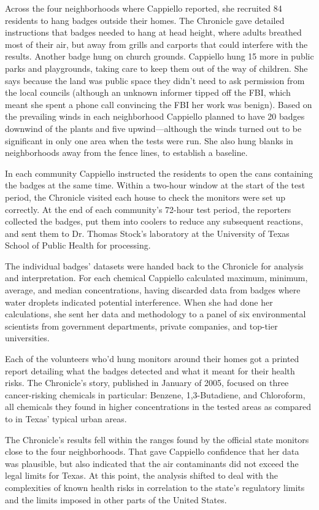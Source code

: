 Across the four neighborhoods where Cappiello reported, she recruited 84
residents to hang badges outside their homes. The Chronicle gave detailed
instructions that badges needed to hang at head height, where adults
breathed most of their air, but away from grills and carports that could
interfere with the results. Another badge hung on church grounds. Cappiello
hung 15 more in public parks and playgrounds, taking care to keep
them out of the way of children. She says because the land was public space
they didn't need to ask permission from the local councils (although an
unknown informer tipped off the FBI, which meant she spent a phone call
convincing the FBI her work was benign). Based on the prevailing winds in
each neighborhood Cappiello planned to have 20 badges downwind of the
plants and five upwind—although the winds turned out to be significant in
only one area when the tests were run. She also hung blanks in neighborhoods
away from the fence lines, to establish a baseline.

In each community Cappiello instructed the residents to open the cans containing
the badges at the same time. Within a two-hour window at the start
of the test period, the Chronicle visited each house to check the monitors
were set up correctly. At the end of each community's 72-hour test period,
the reporters collected the badges, put them into coolers to reduce any subsequent
reactions, and sent them to Dr. Thomas Stock's laboratory at the
University of Texas School of Public Health for processing.

The individual badges' datasets were handed back to the Chronicle for analysis
and interpretation. For each chemical Cappiello calculated maximum,
minimum, average, and median concentrations, having discarded data from
badges where water droplets indicated potential interference. When she
had done her calculations, she sent her data and methodology to a panel of
six environmental scientists from government departments, private companies,
and top-tier universities.

Each of the volunteers who'd hung monitors around their homes got a
printed report detailing what the badges detected and what it meant for
their health risks. The Chronicle's story, published in January of 2005,
focused on three cancer-risking chemicals in particular: Benzene, 1,3-Butadiene,
and Chloroform, all chemicals they found in higher concentrations in
the tested areas as compared to in Texas' typical urban areas.

The Chronicle's results fell within the ranges found by the official state
monitors close to the four neighborhoods. That gave Cappiello confidence
that her data was plausible, but also indicated that the air contaminants did
not exceed the legal limits for Texas. At this point, the analysis shifted to
deal with the complexities of known health risks in correlation to the state's
regulatory limits and the limits imposed in other parts of the United States.

